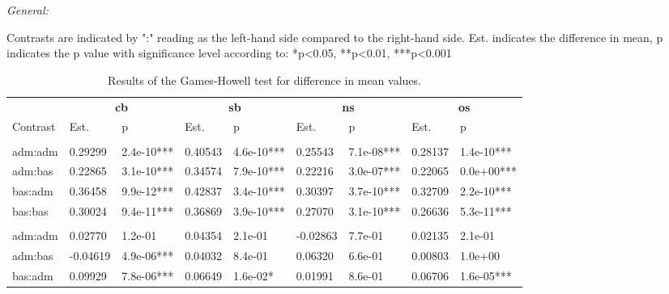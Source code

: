 \documentclass[a4paper,11pt]{article}
\begin{document}
\begingroup\fontsize{8}{10}\selectfont
\begin{ThreePartTable}
\begin{TableNotes}[para]
\item \textit{General:} 
\item Contrasts are indicated by ":" reading as the left-hand side compared to the right-hand side. Est. indicates the difference in mean, p indicates the p value with significance level according to: *p\textless0.05, **p\textless0.01, ***p\textless0.001
\end{TableNotes}
\begin{longtable}[t]{lllllllll}
\caption{\label{tab:04-results-hsd}Results of the Games-Howell test for difference in mean values.}\\
\toprule
\multicolumn{1}{c}{\textbf{ }} & \multicolumn{2}{c}{\textbf{cb}} & \multicolumn{2}{c}{\textbf{sb}} & \multicolumn{2}{c}{\textbf{ns}} & \multicolumn{2}{c}{\textbf{os}} \\
\cmidrule(l{3pt}r{3pt}){2-3} \cmidrule(l{3pt}r{3pt}){4-5} \cmidrule(l{3pt}r{3pt}){6-7} \cmidrule(l{3pt}r{3pt}){8-9}
Contrast & Est. & p & Est. & p & Est. & p & Est. & p\\
\midrule
\addlinespace[0.3em]
\multicolumn{9}{l}{\textbf{EV:LR}}\\
\hspace{1em}adm:adm & 0.29299 & 2.4e-10*** & 0.40543 & 4.6e-10*** & 0.25543 & 7.1e-08*** & 0.28137 & 1.4e-10***\\
\hspace{1em}adm:bas & 0.22865 & 3.1e-10*** & 0.34574 & 7.9e-10*** & 0.22216 & 3.0e-07*** & 0.22065 & 0.0e+00***\\
\hspace{1em}bas:adm & 0.36458 & 9.9e-12*** & 0.42837 & 3.4e-10*** & 0.30397 & 3.7e-10*** & 0.32709 & 2.2e-10***\\
\hspace{1em}bas:bas & 0.30024 & 9.4e-11*** & 0.36869 & 3.9e-10*** & 0.27070 & 3.1e-10*** & 0.26636 & 5.3e-11***\\
\addlinespace[0.3em]
\multicolumn{9}{l}{\textbf{EV:CH}}\\
\hspace{1em}adm:adm & 0.02770 & 1.2e-01 & 0.04354 & 2.1e-01 & -0.02863 & 7.7e-01 & 0.02135 & 2.1e-01\\
\hspace{1em}adm:bas & -0.04619 & 4.9e-06*** & 0.04032 & 8.4e-01 & 0.06320 & 6.6e-01 & 0.00803 & 1.0e+00\\
\hspace{1em}bas:adm & 0.09929 & 7.8e-06*** & 0.06649 & 1.6e-02* & 0.01991 & 8.6e-01 & 0.06706 & 1.6e-05***\\

\end{longtable}
\end{ThreePartTable}
\end{document}
